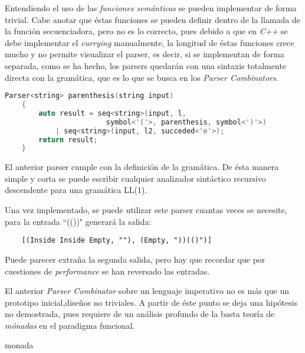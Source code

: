 	Entendiendo el uso de las \emph{funciones semánticas} se pueden implementar de forma trivial. Cabe anotar que éstas funciones se pueden definir dentro de la llamada de la función secuenciadora, pero no es lo correcto, pues debido a que en \emph{C++} se debe implementar el \emph{currying} manualmente, la longitud de éstas funciones crece mucho y no permite visualizar el parser, es decir, si se implementan de forma separada, como se ha hecho, los parsers quedarán con una sintaxis totalmente directa con la gramática, que es lo que se busca en los \emph{Parser Combinators}.
	
	\begin{lstlisting}[language=C++, caption=utilización de los Parser combinators en C++]
	Parser<string> parenthesis(string input)
	{
		auto result = seq<string>(input, l, 
						symbol<'('>, parenthesis, symbol<')'>) 
			| seq<string>(input, l2, succeded<'e'>);
		return result;
	}		
	\end{lstlisting}
	
	El anterior parser cumple con la definición de la gramática. De ésta manera simple y corta se puede escribir cualquier analizador sintáctico recursivo descendente para una gramática LL(1).
	
	Una vez implementado, se puede utilizar este parser cuantas veces se necesite, para la entrada ``(())" generará la salida:
	\begin{lstlisting}
	[(Inside Inside Empty, ""), (Empty, "))(()")]	
	\end{lstlisting}
	
	Puede parecer extraña la segunda salida, pero hay que recordar que por cuestiones de \emph{performance} se han reversado las entradas.
	
El anterior \emph{Parser Combinator} sobre un lenguaje imperativo no es más que un prototipo inicial,diseños no triviales. A partir de éste punto se deja una hipótesis no demostrada, pues requiere de un análisis profundo de la basta teoría de \emph{mónadas} en el paradigma funcional.


\begin{conj}
	monada
\end{conj}



